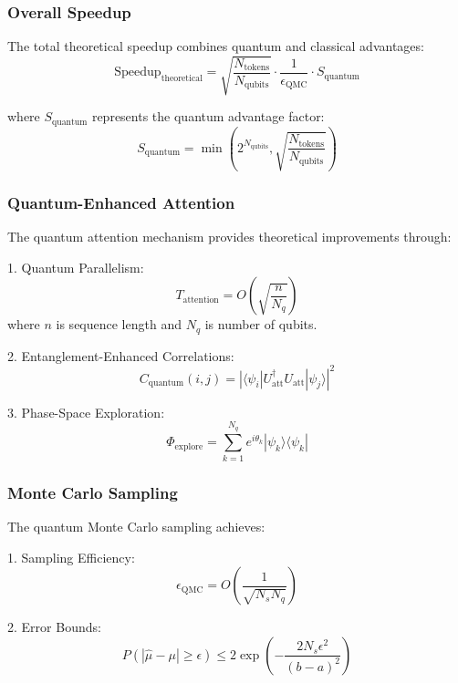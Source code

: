 \documentclass{article}
\begin{document}
\subsubsection{Overall Speedup}
The total theoretical speedup combines quantum and classical advantages:
\begin{equation}
\text{Speedup}_{\text{theoretical}} = \sqrt{\frac{N_{\text{tokens}}}{N_{\text{qubits}}}} \cdot \frac{1}{\epsilon_{\text{QMC}}} \cdot S_{\text{quantum}}
\end{equation}

where $S_{\text{quantum}}$ represents the quantum advantage factor:
\begin{equation}
S_{\text{quantum}} = \min\left(2^{N_{\text{qubits}}}, \sqrt{\frac{N_{\text{tokens}}}{N_{\text{qubits}}}}\right)
\end{equation}

\subsubsection{Quantum-Enhanced Attention}
The quantum attention mechanism provides theoretical improvements through:

1. Quantum Parallelism:
\begin{equation}
T_{\text{attention}} = O\left(\sqrt{\frac{n}{N_q}}\right)
\end{equation}
where $n$ is sequence length and $N_q$ is number of qubits.

2. Entanglement-Enhanced Correlations:
\begin{equation}
C_{\text{quantum}}(i,j) = |\langle\psi_i|U_{\text{att}}^\dagger U_{\text{att}}|\psi_j\rangle|^2
\end{equation}

3. Phase-Space Exploration:
\begin{equation}
\Phi_{\text{explore}} = \sum_{k=1}^{N_q} e^{i\theta_k}|\psi_k\rangle\langle\psi_k|
\end{equation}

\subsubsection{Monte Carlo Sampling}
The quantum Monte Carlo sampling achieves:

1. Sampling Efficiency:
\begin{equation}
\epsilon_{\text{QMC}} = O\left(\frac{1}{\sqrt{N_s N_q}}\right)
\end{equation}

2. Error Bounds:
\begin{equation}
P(|\hat{\mu} - \mu| \geq \epsilon) \leq 2\exp\left(-\frac{2N_s\epsilon^2}{(b-a)^2}\right)
\end{equation}
\end{document}
